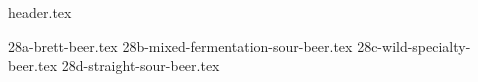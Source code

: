 \clearpage
{}
\divisorLine
{header.tex}
\begin{multicols*}{2}
{28a-brett-beer.tex}
{28b-mixed-fermentation-sour-beer.tex}
{28c-wild-specialty-beer.tex}
{28d-straight-sour-beer.tex}
\end{multicols*}